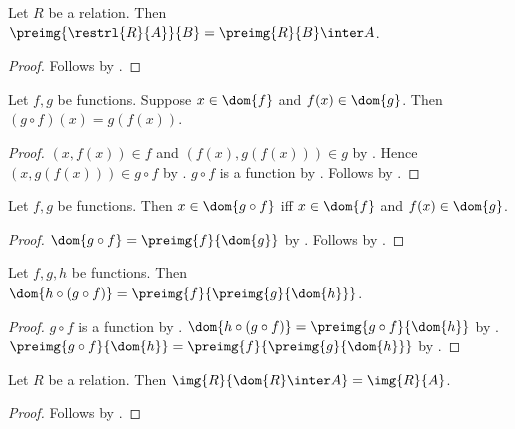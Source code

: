 \begin{theorem}\label{restriction_preimage}
    Let $R$ be a relation.
    Then $\preimg{\restrl{R}{A}}{B}=\preimg{R}{B}\inter A$.
\end{theorem}
\begin{proof}
    Follows by .
\end{proof}

\begin{theorem}\label{partial_composition_apply}
    Let $f,g$ be functions.
    Suppose $x\in\dom{f}$ and $f(x)\in\dom{g}$.
    Then $(g\circ f)(x)=g(f(x))$.
\end{theorem}
\begin{proof}
    $(x,f(x))\in f$ and $(f(x),g(f(x)))\in g$ by
        .
    Hence $(x,g(f(x)))\in g\circ f$ by .
    $g\circ f$ is a function by .
    Follows by .
\end{proof}

\begin{theorem}\label{partial_composition_domain_iff}
    Let $f,g$ be functions.
    Then $x\in\dom{g\circ f}$ iff
        $x\in\dom{f}$ and $f(x)\in\dom{g}$.
\end{theorem}
\begin{proof}
    $\dom{g\circ f}=\preimg{f}{\dom{g}}$ by
        .
    Follows by .
\end{proof}

\begin{theorem}\label{threefold_partial_composition_domain}
    Let $f,g,h$ be functions.
    Then $\dom{h\circ(g\circ f)}
        =\preimg{f}{\preimg{g}{\dom{h}}}$.
\end{theorem}
\begin{proof}
    $g\circ f$ is a function by .
    $\dom{h\circ(g\circ f)}=\preimg{g\circ f}{\dom{h}}$ by
        .
    $\preimg{g\circ f}{\dom{h}}
        =\preimg{f}{\preimg{g}{\dom{h}}}$ by .
\end{proof}

\begin{theorem}\label{image_domain_trace}
    Let $R$ be a relation.
    Then $\img{R}{\dom{R}\inter A}=\img{R}{A}$.
\end{theorem}
\begin{proof}
    Follows by .
\end{proof}

